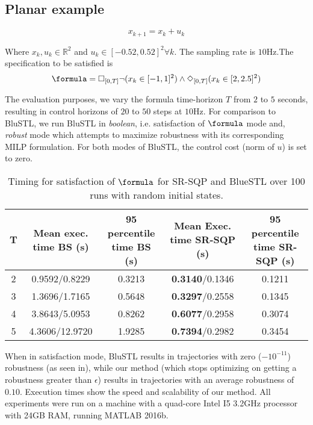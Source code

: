 \subsection{Planar example}

\begin{equation}
x_{k+1} = x_k + u_k
\end{equation}

Where $x_k,u_k \in \mathbb{R}^2$ and $ u_k \in [-0.52,0.52]^2 \forall k$. The sampling rate is $10$Hz.The specification to be satisfied is
\begin{equation}
\formula = \always_{[0,T]} \neg (x_k \in [-1,1]^2) \land \eventually_{[0,T]} (x_k \in [2,2.5]^2)
\end{equation}

The evaluation purposes, we vary the formula time-horizon $T$ from $2$ to $5$ seconds, resulting in control horizons of $20$ to $50$ steps at $10$Hz. For comparison to BluSTL, we run BluSTL in \textit{boolean}, i.e. satisfaction of $\formula$ mode and, \textit{robust} mode which attempts to maximize robustness with its corresponding MILP formulation. For both modes of BluSTL, the control cost (norm of $u$) is set to zero.

\begin{table*}[tb]
\small
\begin{center}
\caption{{\small Timing for satisfaction of $\formula$ for SR-SQP and BlueSTL over 100 runs with random initial states.}}
\vspace{-10pt}
\label{tbl:sat_performance_toy}
\begin{tabular} {|c|c|c|c|c|}
	\hline
	\textbf{T} & Mean exec. time BS (s) & 95 percentile time BS (s) &  Mean Exec. time SR-SQP (s) & 95 percentile time SR-SQP (s)\\ \hline
	2 & 0.9592/0.8229 & 0.3213 & \textbf{0.3140}/0.1346 & 0.1211\\ \hline
	3 & 1.3696/1.7165 & 0.5648 & \textbf{0.3297}/0.2558 & 0.1345 \\ \hline
	4 & 3.8643/5.0953 & 0.8262  & \textbf{0.6077}/0.2958 & 0.3074 \\ \hline
	5 & 4.3606/12.9720 & 1.9285  & \textbf{0.7394}/0.2982 & 0.3454 \\ \hline
\end{tabular}	
\end{center}
\vspace{-20pt}
\end{table*}

When in satisfaction mode, BluSTL results in trajectories with zero ($-10^{-11}$) robustness (as seen in), while our method (which stops optimizing on getting a robustness greater than $\epsilon$) results in trajectories with an average robustness of $0.10$. Execution times show the speed and scalability of our method. All experiments were run on a machine with a quad-core Intel I5 3.2GHz processor with 24GB RAM, running MATLAB 2016b. 

